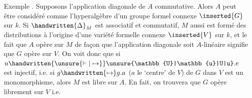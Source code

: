 Exemple . Supposons l'application diagonale de $A$ commutative. Alors $A$ peut être considéré comme l'hyperalgèbre d'un groupe formel connexe $\inserted{G}$ sur $k$. Si $\handwritten{\Delta}_{M}$ est associatif et commutatif, $M$ aussi est formé des distributions à l'origine d'une variété formelle connexe $\inserted{V}$ sur $k$, et le fait que $A$ opère sur $M$ de façon que l'application diagonale soit $A$-linéaire signifie que $G$ opère sur $V$. On voit donc que si $u\handwritten{\unsure{\vdash|\mapsto}}\unsure{\mathbb{U}|\mathbb{u}|U|u}.e$  est injectif, i.e. si $g\handwritten{\mapsto}g.a$ ($a$ le `centre' de $V$) de $G$ dans $V$ est un monomorphisme, alors $M$ est libre sur $A$. En fait, on trouvera que $G$ opère librement sur $V$ i.e.
